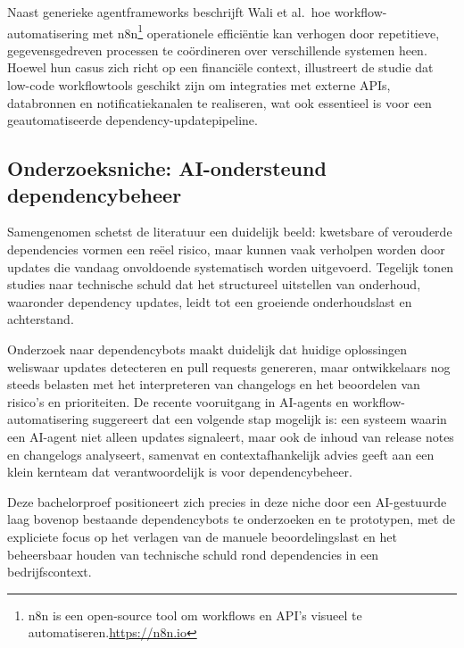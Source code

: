 Naast generieke agentframeworks beschrijft Wali et al.\ hoe workflow-automatisering met n8n\footnote{n8n is een open-source tool om workflows en API’s visueel te automatiseren.\url{https://n8n.io}} operationele efficiëntie kan verhogen door repetitieve, gegevensgedreven processen te coördineren over verschillende systemen heen.\autocite{Wali2025} Hoewel hun casus zich richt op een financiële context, illustreert de studie dat low-code workflowtools geschikt zijn om integraties met externe APIs, databronnen en notificatiekanalen te realiseren, wat ook essentieel is voor een geautomatiseerde dependency-updatepipeline.\autocite{Wali2025}

\subsection{Onderzoeksniche: AI-ondersteund dependencybeheer}

Samengenomen schetst de literatuur een duidelijk beeld: kwetsbare of verouderde dependencies vormen een reëel risico, maar kunnen vaak verholpen worden door updates die vandaag onvoldoende systematisch worden uitgevoerd.\autocite{Pashchenko2018,Behutiye2024} Tegelijk tonen studies naar technische schuld dat het structureel uitstellen van onderhoud, waaronder dependency updates, leidt tot een groeiende onderhoudslast en achterstand.\autocite{Behutiye2024,Ruiz2024,Chalmers2020}

Onderzoek naar dependencybots maakt duidelijk dat huidige oplossingen weliswaar updates detecteren en pull requests genereren, maar ontwikkelaars nog steeds belasten met het interpreteren van changelogs en het beoordelen van risico's en prioriteiten.\autocite{Erlenhov2022} De recente vooruitgang in AI-agents en workflow-automatisering suggereert dat een volgende stap mogelijk is: een systeem waarin een AI-agent niet alleen updates signaleert, maar ook de inhoud van release notes en changelogs analyseert, samenvat en contextafhankelijk advies geeft aan een klein kernteam dat verantwoordelijk is voor dependencybeheer.\autocite{Joshi2025,Kim2024,Zhu2025,Wali2025}

Deze bachelorproef positioneert zich precies in deze niche door een AI-gestuurde laag bovenop bestaande dependencybots te onderzoeken en te prototypen, met de expliciete focus op het verlagen van de manuele beoordelingslast en het beheersbaar houden van technische schuld rond dependencies in een bedrijfscontext.


